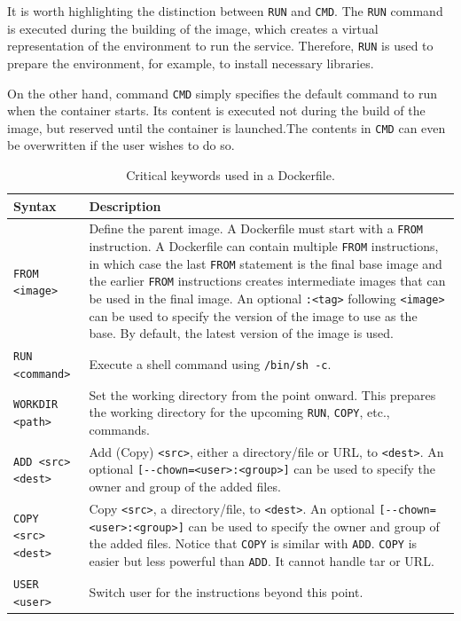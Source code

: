It is worth highlighting the distinction between \verb|RUN| and \verb|CMD|. The \verb|RUN| command is executed during the building of the image, which creates a virtual representation of the environment to run the service. Therefore, \verb|RUN| is used to prepare the environment, for example, to install necessary libraries. 

On the other hand, command \verb|CMD| simply specifies the default command to run when the container starts. Its content is executed not during the build of the image, but reserved until the container is launched.The contents in \verb|CMD| can even be overwritten if the user wishes to do so.

\begin{table}[!htbp]
	\centering \caption{Critical keywords used in a Dockerfile.}\label{ch:vac:tab:keywordsdockerfile}
	\begin{tabularx}{\textwidth}{lX}
		\hline
		Syntax & Description \\ \hline
		\verb|FROM <image>| & Define the parent image. A Dockerfile must start with a \verb|FROM| instruction. A Dockerfile can contain multiple \verb|FROM| instructions, in which case the last \verb|FROM| statement is the final base image and the earlier \verb|FROM| instructions creates intermediate images that can be used in the final image. An optional \verb|:<tag>| following \verb|<image>| can be used to specify the version of the image to use as the base. By default, the latest version of the image is used. \\ 
		\verb|RUN <command>| & Execute a shell command using \verb|/bin/sh -c|. \\ 
		\verb|WORKDIR <path>| & Set the working directory from the point onward. This prepares the working directory for the upcoming \verb|RUN|, \verb|COPY|, etc., commands. \\ 
		\verb|ADD <src> <dest>| & Add (Copy) \verb|<src>|, either a directory/file or URL, to \verb|<dest>|. An optional \verb|[--chown=<user>:<group>]| can be used to specify the owner and group of the added files. \\ 
		\verb|COPY <src> <dest>| & Copy \verb|<src>|, a directory/file, to \verb|<dest>|. An optional \verb|[--chown=<user>:<group>]| can be used to specify the owner and group of the added files. Notice that \verb|COPY| is similar with \verb|ADD|. \verb|COPY| is easier but less powerful than \verb|ADD|. It cannot handle tar or URL. \\ 
		\verb|USER <user>| & Switch user for the instructions beyond this point. \\ 

\end{tabularx}
\end{table}
